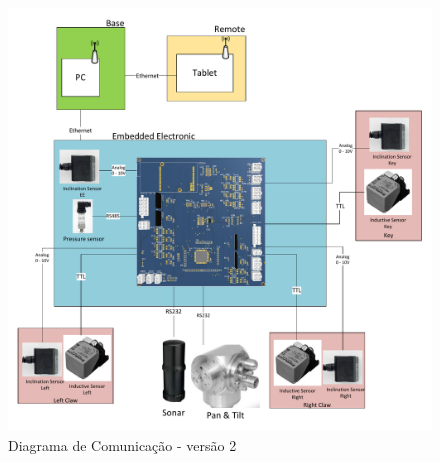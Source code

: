 \begin{figure}[H]
\centering
\includegraphics[width=1\columnwidth]{figs/eletronica/com_placav2.pdf}
\caption{Diagrama de Comunicação - versão 2}
\label{com_placav2}
\end{figure}